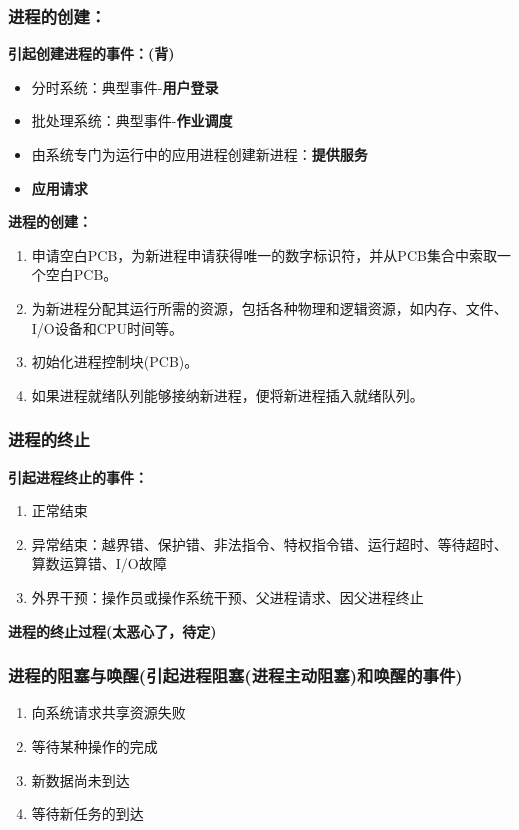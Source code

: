 \documentclass{article}
\begin{document}
\subsubsection{进程的创建：}
\noindent\textbf{引起创建进程的事件：{\color{green}(背)}}
\begin{itemize}
    \item 分时系统：典型事件-\textbf{用户登录}
    \item 批处理系统：典型事件-\textbf{作业调度}
    \item 由系统专门为运行中的应用进程创建新进程：\textbf{提供服务}
    \item \textbf{应用请求}
\end{itemize}
\textbf{进程的创建：}
\begin{enumerate}
    \item 申请空白PCB，为新进程申请获得唯一的数字标识符，并从PCB集合中索取一个空白PCB。
    \item 为新进程分配其运行所需的资源，包括各种物理和逻辑资源，如内存、文件、I/O设备和CPU时间等。
    \item 初始化进程控制块(PCB)。
    \item 如果进程就绪队列能够接纳新进程，便将新进程插入就绪队列。
\end{enumerate}
\subsubsection{进程的终止}
\noindent\textbf{引起进程终止的事件：}
\begin{enumerate}
    \item 正常结束
    \item 异常结束：越界错、保护错、非法指令、特权指令错、运行超时、等待超时、
    算数运算错、I/O故障
    \item 外界干预：操作员或操作系统干预、父进程请求、因父进程终止
\end{enumerate}
\textbf{进程的终止过程(太恶心了，待定)}
\subsubsection{进程的阻塞与唤醒(引起进程阻塞(进程主动阻塞)和唤醒的事件)}
\begin{enumerate}
    \item 向系统请求共享资源失败
    \item 等待某种操作的完成
    \item 新数据尚未到达
    \item 等待新任务的到达
\end{enumerate}
\end{document}
